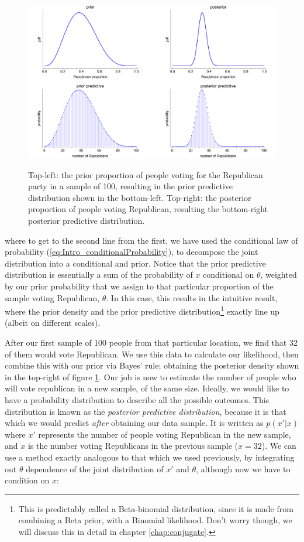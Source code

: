 \documentclass[11pt,fullpage]{book}
\begin{document}
\begin{figure}
\centering
\scalebox{0.4} 
{\includegraphics{Posterior_priorPosteriorPredictiveVoting.pdf}}
\caption{Top-left: the prior proportion of people voting for the Republican party in a sample of 100, resulting in the prior predictive distribution shown in the bottom-left. Top-right: the posterior proportion of people voting Republican, resulting the bottom-right posterior predictive distribution.}\label{fig:Posterior_priorPosteriorPredictiveVoting}
\end{figure}


where to get to the second line from the first, we have used the conditional law of probability (\ref{eq:Intro_conditionalProbability}), to decompose the joint distribution into a conditional and prior. Notice that the prior predictive distribution is essentially a sum of the probability of $x$ conditional on $\theta$, weighted by our prior probability that we assign to that particular proportion of the sample voting Republican, $\theta$. In this case, this results in the intuitive result, where the prior density and the prior predictive distribution\footnote{This is predictably called a Beta-binomial distribution, since it is made from combining a Beta prior, with a Binomial likelihood. Don't worry though, we will discuss this in detail in chapter \ref{chap:conjugate}.} exactly line up (albeit on different scales).

After our first sample of 100 people from that particular location, we find that 32 of them would vote Republican. We use this data to calculate our likelihood, then combine this with our prior via Bayes' rule; obtaining the posterior density shown in the top-right of figure \ref{fig:Posterior_priorPosteriorPredictiveVoting}. Our job is now to estimate the number of people who will vote republican in a new sample, of the same size. Ideally, we would like to have a probability distribution to describe all the possible outcomes. This distribution is known as the \textit{posterior predictive distribution}, because it is that which we would predict \textit{after} obtaining our data sample. It is written as $p(x'|x)$ where $x'$ represents the number of people voting Republican in the new sample, and $x$ is the number voting Republicans in the previous sample ($x=32$). We can use a method exactly analogous to that which we used previously, by integrating out $\theta$ dependence of the joint distribution of $x'$ and $\theta$, although now we have to condition on $x$:
\end{document}
